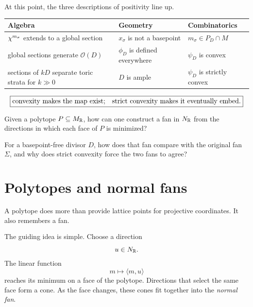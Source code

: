 \begin{threedictionaries}
At this point, the three descriptions of positivity line up.

\medskip

\begin{center}
\small
\begin{tabularx}{\linewidth}{@{}
  >{\raggedright\arraybackslash}X
  >{\raggedright\arraybackslash}X
  >{\raggedright\arraybackslash}X@{}}
\toprule
\textbf{Algebra}
&
\textbf{Geometry}
&
\textbf{Combinatorics}
\\
\midrule
\(\chi^{m_\sigma}\) extends to a global section
&
\(x_\sigma\) is not a basepoint
&
\(m_\sigma\in P_D\cap M\)
\\[1mm]
global sections generate \(\mathcal O(D)\)
&
\(\phi_D\) is defined everywhere
&
\(\psi_D\) is convex
\\[1mm]
sections of \(kD\) separate toric strata for \(k\gg0\)
&
\(D\) is ample
&
\(\psi_D\) is strictly convex
\\
\bottomrule
\end{tabularx}
\end{center}

\[
\boxed{
\text{convexity makes the map exist;\quad
strict convexity makes it eventually embed.}
}
\]
\end{threedictionaries}

\begin{guidingquestion}
Given a polytope \(P\subseteq M_{\mathbb{R}}\), how can one construct a fan in
\(N_{\mathbb{R}}\) from the directions in which each face of \(P\) is
minimized?

For a basepoint-free divisor \(D\), how does that fan compare with the
original fan \(\Sigma\), and why does strict convexity force the two
fans to agree?
\end{guidingquestion}

\section{Polytopes and normal fans}
\label{sec:polytopes-normal-fans}

A polytope does more than provide lattice points for projective
coordinates. It also remembers a fan.

The guiding idea is simple. Choose a direction
\[
u\in N_{\mathbb{R}}.
\]
The linear function
\[
m\longmapsto\langle m,u\rangle
\]
reaches its minimum on a face of the polytope. Directions that select
the same face form a cone. As the face changes, these cones fit
together into the \emph{normal fan}.

